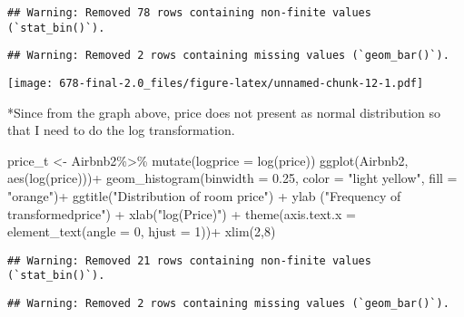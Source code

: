 \documentclass[
]{article}
\newenvironment{Shaded}{\begin{snugshade}}{\end{snugshade}}
\newcommand{\AttributeTok}[1]{\textcolor[rgb]{0.77,0.63,0.00}{#1}}
\newcommand{\DecValTok}[1]{\textcolor[rgb]{0.00,0.00,0.81}{#1}}
\newcommand{\FloatTok}[1]{\textcolor[rgb]{0.00,0.00,0.81}{#1}}
\newcommand{\FunctionTok}[1]{\textcolor[rgb]{0.00,0.00,0.00}{#1}}
\newcommand{\NormalTok}[1]{#1}
\newcommand{\OtherTok}[1]{\textcolor[rgb]{0.56,0.35,0.01}{#1}}
\newcommand{\SpecialCharTok}[1]{\textcolor[rgb]{0.00,0.00,0.00}{#1}}
\newcommand{\StringTok}[1]{\textcolor[rgb]{0.31,0.60,0.02}{#1}}
\begin{document}
\begin{verbatim}
## Warning: Removed 78 rows containing non-finite values (`stat_bin()`).
\end{verbatim}

\begin{verbatim}
## Warning: Removed 2 rows containing missing values (`geom_bar()`).
\end{verbatim}

\texttt{[image: 678-final-2.0\_files/figure-latex/unnamed-chunk-12-1.pdf]}

*Since from the graph above, price does not present as normal
distribution so that I need to do the log transformation.

\begin{Shaded}
\begin{Highlighting}[]
\NormalTok{price\_t }\OtherTok{\textless{}{-}}\NormalTok{ Airbnb2}\SpecialCharTok{\%\textgreater{}\%}
  \FunctionTok{mutate}\NormalTok{(}\AttributeTok{logprice =} \FunctionTok{log}\NormalTok{(price))}
\FunctionTok{ggplot}\NormalTok{(Airbnb2, }\FunctionTok{aes}\NormalTok{(}\FunctionTok{log}\NormalTok{(price)))}\SpecialCharTok{+} \FunctionTok{geom\_histogram}\NormalTok{(}\AttributeTok{binwidth =} \FloatTok{0.25}\NormalTok{, }\AttributeTok{color =} \StringTok{"light yellow"}\NormalTok{, }\AttributeTok{fill =} \StringTok{"orange"}\NormalTok{)}\SpecialCharTok{+} \FunctionTok{ggtitle}\NormalTok{(}\StringTok{"Distribution of room price"}\NormalTok{) }\SpecialCharTok{+} \FunctionTok{ylab}\NormalTok{ (}\StringTok{"Frequency of transformedprice"}\NormalTok{) }\SpecialCharTok{+} \FunctionTok{xlab}\NormalTok{(}\StringTok{"log(Price)"}\NormalTok{) }\SpecialCharTok{+} \FunctionTok{theme}\NormalTok{(}\AttributeTok{axis.text.x =} \FunctionTok{element\_text}\NormalTok{(}\AttributeTok{angle =} \DecValTok{0}\NormalTok{, }\AttributeTok{hjust =} \DecValTok{1}\NormalTok{))}\SpecialCharTok{+} \FunctionTok{xlim}\NormalTok{(}\DecValTok{2}\NormalTok{,}\DecValTok{8}\NormalTok{)}
\end{Highlighting}
\end{Shaded}

\begin{verbatim}
## Warning: Removed 21 rows containing non-finite values (`stat_bin()`).
\end{verbatim}

\begin{verbatim}
## Warning: Removed 2 rows containing missing values (`geom_bar()`).
\end{verbatim}
\end{document}
